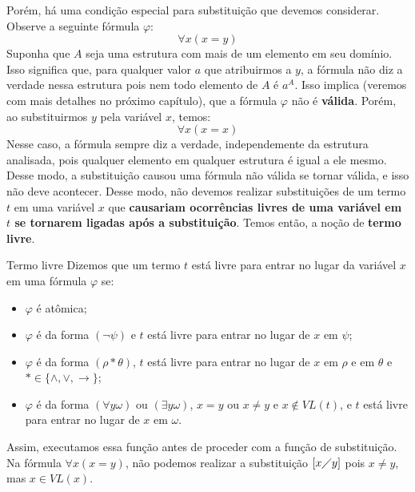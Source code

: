 Porém, há uma condição especial para substituição que devemos considerar. Observe a seguinte fórmula $\varphi$:
\[\forall x(x = y)\]
Suponha que $A$ seja uma estrutura com mais de um elemento em seu domínio. Isso significa que, para qualquer valor $a$ que atribuirmos a $y$, a fórmula não diz a verdade nessa estrutura pois nem todo elemento de $A$ é $a^A$. Isso implica (veremos com mais detalhes no próximo capítulo), que a fórmula $\varphi$ não é \textbf{válida}. Porém, ao substituirmos $y$ pela variável $x$, temos:
\[\forall x(x = x)\]
Nesse caso, a fórmula sempre diz a verdade, independemente da estrutura analisada, pois qualquer elemento em qualquer estrutura é igual a ele mesmo. Desse modo, a substituição causou uma fórmula não válida se tornar válida, e isso não deve acontecer. Desse modo, não devemos realizar substituições de um termo $t$ em uma variável $x$ que \textbf{causariam ocorrências livres de uma variável em $t$ se tornarem ligadas após a substituição}. Temos então, a noção de \textbf{termo livre}.
\begin{definition}{Termo livre}
    Dizemos que um termo $t$ está livre para entrar no lugar da variável $x$ em uma fórmula $\varphi$ se:
    \begin{itemize}
        \item $\varphi$ é atômica;
        \item $\varphi$ é da forma $(\neg \psi)$ e $t$ está livre para entrar no lugar de $x$ em $\psi$;
        \item $\varphi$ é da forma $(\rho * \theta)$, $t$ está livre para entrar no lugar de $x$ em $\rho$ e em $\theta$ e $* \in \{\land, \lor, \rightarrow\}$;
        \item $\varphi$ é da forma $(\forall y\omega)$ ou $(\exists y\omega)$, $x = y$ ou $x \neq y$ e $x \notin VL(t)$, e $t$ está livre para entrar no lugar de $x$ em $\omega$.
    \end{itemize}
\end{definition}
Assim, executamos essa função antes de proceder com a função de substituição. Na fórmula $\forall x(x = y)$, não podemos realizar a substituição $[x\diagup y]$ pois $x \neq y$, mas $x \in VL(x)$.